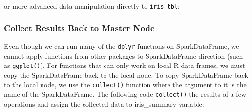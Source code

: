 \documentclass[
]{article}
\newenvironment{Shaded}{\begin{snugshade}}{\end{snugshade}}
\newcommand{\CommentTok}[1]{\textcolor[rgb]{0.56,0.35,0.01}{\textit{#1}}}
\newcommand{\DataTypeTok}[1]{\textcolor[rgb]{0.13,0.29,0.53}{#1}}
\newcommand{\DecValTok}[1]{\textcolor[rgb]{0.00,0.00,0.81}{#1}}
\newcommand{\KeywordTok}[1]{\textcolor[rgb]{0.13,0.29,0.53}{\textbf{#1}}}
\newcommand{\NormalTok}[1]{#1}
\newcommand{\OperatorTok}[1]{\textcolor[rgb]{0.81,0.36,0.00}{\textbf{#1}}}
\newcommand{\StringTok}[1]{\textcolor[rgb]{0.31,0.60,0.02}{#1}}
\begin{document}
or more advanced data manipulation directly to \texttt{iris\_tbl}:

\begin{Shaded}
\end{Shaded}

\hypertarget{collect-results-back-to-master-node}{%
\subsubsection{Collect Results Back to Master
Node}\label{collect-results-back-to-master-node}}

Even though we can run many of the \texttt{dplyr} functions on
SparkDataFrame, we cannot apply functions from other packages to
SparkDataFrame direction (such as \texttt{ggplot()}). For functions that
can only work on local R data frames, we must copy the SparkDataFrame
back to the local node. To copy SparkDataFrame back to the local node,
we use the \texttt{collect()} function where the argument to it is the
name of the SparkDataFrame. The following code \texttt{collect()} the
results of a few operations and assign the collected data to
iris\_summary variable:

\begin{Shaded}
\end{Shaded}
\end{document}
